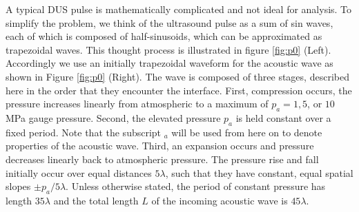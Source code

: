 A typical \ac{DUS} pulse is mathematically complicated and not ideal
for analysis. To simplify the problem, we think of the ultrasound
pulse as a sum of sin waves, each of which is composed of
half-sinusoids, which can be approximated as trapezoidal waves. This
thought process is illustrated in figure \ref{fig:p0}
(Left). Accordingly we use an initially trapezoidal waveform for the
acoustic wave as shown in Figure \ref{fig:p0} (Right). The wave is
composed of three stages, described here in the order that they
encounter the interface. First, compression occurs, the pressure
increases linearly from atmospheric to a maximum of $p_a=1, 5$, or
$10$ MPa gauge pressure. Second, the elevated pressure $p_a$ is held
constant over a fixed period. Note that the subscript $_a$ will be
used from here on to denote properties of the acoustic wave. Third, an
expansion occurs and pressure decreases linearly back to atmospheric
pressure. The pressure rise and fall initially occur over equal
distances $5\lambda$, such that they have constant, equal spatial
slopes $\pm p_{a}/5\lambda$. Unless otherwise stated, the period of
constant pressure has length $35\lambda$ and the total length $L$
of the incoming acoustic wave is $45\lambda$.
% 
